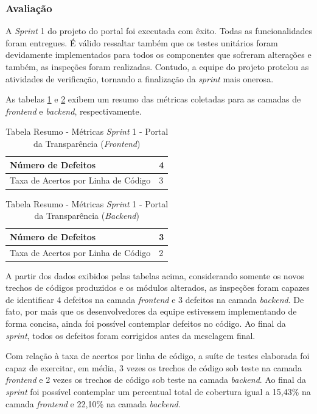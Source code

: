 \subsubsection{Avaliação}

A \textit{Sprint} 1 do projeto do portal foi executada com êxito. Todas as funcionalidades foram entregues. É válido ressaltar também que os testes unitários foram devidamente implementados para todos os componentes que sofreram alterações e também, as inspeções foram realizadas. Contudo, a equipe do projeto protelou as atividades de verificação, tornando a finalização da \textit{sprint} mais onerosa.

As tabelas \ref{table:tabela2} e \ref{table:tabela3} exibem um resumo das métricas coletadas para as camadas de \textit{frontend} e \textit{backend}, respectivamente.

\begin{table}[h]
\caption{Tabela Resumo - Métricas \textit{Sprint} 1 - Portal da Transparência (\textit{Frontend})}
\centering
\begin{tabular}{ | m{8cm} | m{8cm} | } 
\hline
Número de Defeitos & 4 \\ 
\hline
Taxa de Acertos por Linha de Código & 3 \\ 
\hline
\end{tabular}
\label{table:tabela2}
\end{table}

\begin{table}[h]
\caption{Tabela Resumo - Métricas \textit{Sprint} 1 - Portal da Transparência (\textit{Backend})}
\centering
\begin{tabular}{ | m{8cm} | m{8cm} | } 
\hline
Número de Defeitos & 3 \\ 
\hline
Taxa de Acertos por Linha de Código & 2 \\ 
\hline
\end{tabular}
\label{table:tabela3}
\end{table}

A partir dos dados exibidos pelas tabelas acima, considerando somente os novos trechos de códigos produzidos e os módulos alterados, as inspeções foram capazes de identificar 4 defeitos na camada \textit{frontend} e 3 defeitos na camada \textit{backend}. De fato, por mais que os desenvolvedores da equipe estivessem implementando de forma concisa, ainda foi possível contemplar defeitos no código. Ao final da \textit{sprint}, todos os defeitos foram corrigidos antes da mesclagem final.

Com relação à taxa de acertos por linha de código, a suíte de testes elaborada foi capaz de exercitar, em média, 3 vezes os trechos de código sob teste na camada \textit{frontend} e 2 vezes os trechos de código sob teste na camada \textit{backend}. Ao final da \textit{sprint} foi possível contemplar um percentual total de cobertura igual a 15,43\% na camada \textit{frontend} e 22,10\% na camada \textit{backend}.

